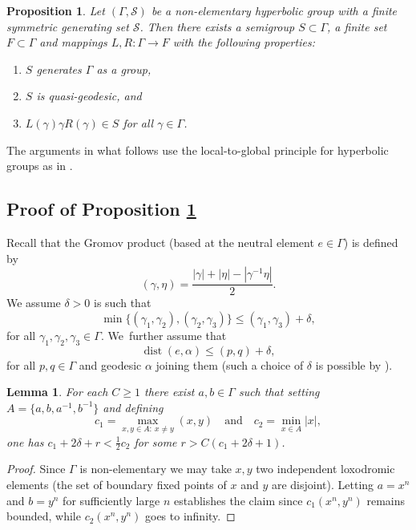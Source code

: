 \documentclass[10pt]{amsart}
\newcommand{\quand}{\quad\text{and}\quad}
\newtheorem{proposition}[theorem]{Proposition}
\newtheorem{lemma}[theorem]{Lemma}
\newcommand{\cS}{\mathcal{S}}
\DeclareMathOperator{\dist}{dist}
\begin{document}
\begin{proposition}\label{semigrouplemma}
Let \((\Gamma,\cS)\) be a non-elementary hyperbolic group with a finite symmetric generating set \(\cS\). Then there exists a semigroup \(S \subset \Gamma\), a finite set \(F \subset \Gamma\) and mappings \(L,R:\Gamma \to F\) with the following properties:
\begin{enumerate}
\item \(S\) generates \(\Gamma\) as a group,
\item \(S\) is quasi-geodesic, and
\item \(L(\gamma)\gamma R(\gamma) \in S\) for all \(\gamma \in \Gamma\).
\end{enumerate}
\end{proposition}

The arguments in what follows use the local-to-global principle for hyperbolic groups as in \cite[\S 3]{gouezel}.

\subsection{Proof of Proposition \ref{semigrouplemma}}

Recall that the Gromov product (based at the neutral element \(e \in \Gamma\)) is defined by
\[
(\gamma,\eta) = \frac{|\gamma| + |\eta| - |\gamma^{-1}\eta|}{2}.
\]
We assume \(\delta > 0\) is such that
\[
\min\lbrace (\gamma_1,\gamma_2),(\gamma_2,\gamma_3)\rbrace \le (\gamma_1,\gamma_3) + \delta,
\]
for all \(\gamma_1,\gamma_2,\gamma_3 \in \Gamma\). We~further assume that
\[
\dist(e,\alpha) \le (p,q) + \delta,
\]
for all \(p,q \in \Gamma\) and geodesic \(\alpha\) joining them (such a choice of \(\delta\) is possible by \cite[Prop.\,1.22]{bridson-haefliger}).

\begin{lemma}
For each \(C \ge 1\) there exist \(a,b \in \Gamma\) such that setting \(A = \lbrace a,b,a^{-1},b^{-1}\rbrace\) and defining
\[
c_1 = \max_{x,y \in A:\ x \neq y}(x,y)\quand c_2 = \min_{x \in A}|x|,
\]
one has \(c_1 + 2\delta + r < \frac{1}{2}{c_2}\) for some \(r > C(c_1+2\delta+1)\).
\end{lemma}
\begin{proof}
Since \(\Gamma\) is non-elementary we may take \(x,y\) two independent loxodromic elements (\ie the set of boundary fixed points of \(x\) and \(y\) are disjoint).
Letting \(a = x^n\) and \(b = y^n\) for sufficiently large \(n\) establishes the claim since \(c_1(x^n,y^n)\) remains bounded, while \(c_2(x^n,y^n)\) goes to infinity.
\end{proof}
\end{document}
